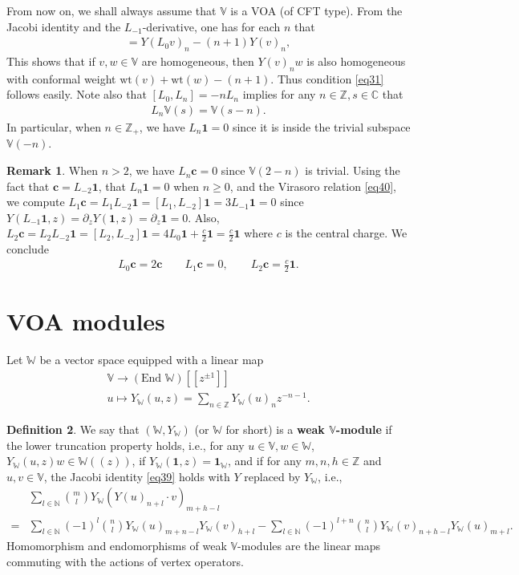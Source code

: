 \documentclass[12pt,b5paper,notitlepage]{report}
\theoremstyle{definition}
\newtheorem{df}{Definition}[section]
\newtheorem{rem}[df]{Remark}
\theoremstyle{plain}
\newcommand{\id}{\mathbf{1}}
\newcommand{\mbb}{\mathbb}
\newcommand{\Vbb}{\mathbb V}
\newcommand{\Wbb}{\mathbb W}
\newcommand{\Cbb}{\mathbb C}
\newcommand{\Zbb}{\mathbb Z}
\newcommand{\cbf}{\mathbf c}
\newcommand{\wt}{\mathrm{wt}}
\numberwithin{equation}{section}
\begin{document}
From now on, we shall always assume that $\Vbb$ is a VOA (of CFT type). From the Jacobi identity and the $L_{-1}$-derivative, one has for each $n$ that
\begin{align*}
[L_0,Y(v)_n]=Y(L_0 v)_n-(n+1)Y(v)_n,
\end{align*}
This shows that if $v,w\in\mbb V$ are homogeneous, then $Y(v)_nw$ is also homogeneous with conformal weight $\wt(v)+\wt(w)-(n+1)$. Thus condition \eqref{eq31} follows easily. Note also that $[L_0,L_n]=-nL_n$ implies for any $n\in\mbb Z,s\in\Cbb$ that
\begin{align}
L_n\Vbb(s)=\Vbb(s-n).
\end{align}
In particular, when $n\in\Zbb_+$, we have $L_n\id=0$ since it is inside the trivial subspace $\Vbb(-n)$.

\begin{rem}\label{lb58}
When $n>2$, we have $L_n\cbf=0$ since $\Vbb(2-n)$ is trivial. Using the fact that $\cbf=L_{-2}\id$, that $L_n\id=0$ when $n\geq0$,  and the Virasoro relation \eqref{eq40}, we compute $L_1\cbf=L_1L_{-2}\id=[L_1,L_{-2}]\id=3L_{-1}\id=0$ since $Y(L_{-1}\id,z)=\partial_zY(\id,z)=\partial_z\id=0$. Also, $L_2\cbf=L_2L_{-2}\id=[L_2,L_{-2}]\id=4L_0\id+\frac c 2\id=\frac c 2\id$ where $c$ is the central charge. We conclude
\begin{gather*}
L_0\cbf=2\cbf\qquad L_1\cbf=0,\qquad L_2\cbf=\frac c2 \id.
\end{gather*}
\end{rem}





\section{VOA modules}



Let $\Wbb$ be a vector space equipped with a linear map
\begin{gather}
\Vbb\rightarrow(\text{End }\Wbb)[[z^{\pm1}]]\nonumber\\
u\mapsto Y_\Wbb(u,z)=\sum_{n\in\mathbb Z}Y_\Wbb(u)_n z^{-n-1}.\label{eq51}
\end{gather}



\begin{df}
We say that $(\Wbb,Y_\Wbb)$ \index{Y@$Y,Y_\Wbb$} (or $\Wbb$ for short) is a \textbf{weak $\Vbb$-module} if the lower truncation property holds, i.e., for any $u\in\Vbb,w\in\Wbb$, $Y_\Wbb(u,z)w\in\Wbb((z))$, if $Y_\Wbb(\id,z)=\id_\Wbb$, and if for any $m,n,h\in\mbb Z$ and $u,v\in\Vbb$, the Jacobi identity \eqref{eq39} holds with $Y$ replaced by $Y_\Wbb$, i.e.,
\begin{align}
&\sum_{l\in\mathbb N}{m\choose l}Y_\Wbb(Y(u)_{n+l}\cdot v)_{m+h-l}\nonumber\\
=&\sum_{l\in\mathbb N}(-1)^l{n\choose l}Y_\Wbb(u)_{m+n-l}Y_\Wbb(v)_{h+l}-\sum_{l\in\mathbb N}(-1)^{l+n}{n\choose l}Y_\Wbb(v)_{n+h-l}Y_\Wbb(u)_{m+l}.\label{eq192}
\end{align}
Homomorphism and endomorphisms of weak $\Vbb$-modules are the linear maps commuting with the actions of vertex operators.
\end{df}
\end{document}
